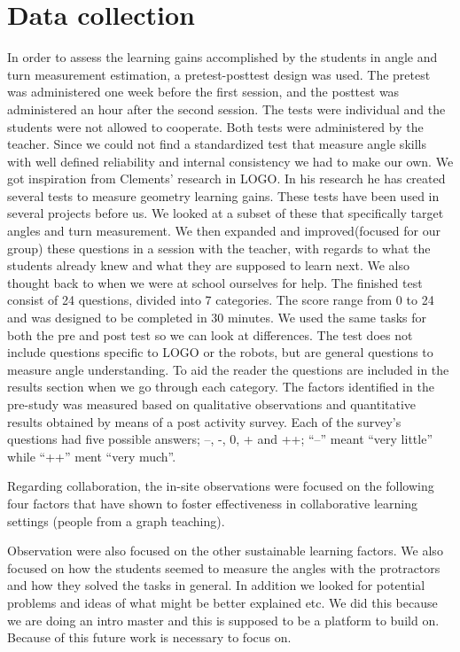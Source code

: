 \chapter{Data collection}
In order to assess the learning gains accomplished by the students in angle and turn measurement estimation, a pretest-posttest design was used. The pretest was administered one week before the first session, and the posttest was administered an hour after the second session. The tests were individual and the students were not allowed to cooperate. Both tests were administered by the teacher. Since we could not find a standardized test that measure angle skills with well defined reliability and internal consistency we had to make our own. We got inspiration from Clements’ research in LOGO. In his research he has created several tests to measure geometry learning gains. These tests have been used in several projects before us. We looked at a subset of these that specifically target angles and turn measurement. We then expanded and improved(focused for our group) these questions in a session with the teacher, with regards to what the students already knew and what they are supposed to learn next. We also thought back to when we were at school ourselves for help. The finished test consist of 24 questions, divided into 7 categories. The score range from 0 to 24 and was designed to be completed in 30 minutes. We used the same tasks for both the pre and post test so we can look at differences. The test does not include questions specific to LOGO or the robots, but are general questions to measure angle understanding. To aid the reader the questions are included in the results section when we go through each category. The factors identified in the pre-study was measured based on qualitative observations and quantitative results obtained by means of a post activity survey. Each of the survey’s questions had five possible answers; --, -, 0, + and ++; “--” meant “very little” while “++” ment “very much”.

\bigskip\noindent
Regarding collaboration, the in-site observations were focused on the following four factors that have shown to foster effectiveness in collaborative learning settings (people from a graph teaching).

\bigskip\noindent
Observation were also focused on the other sustainable learning factors. We also focused on how the students seemed to measure the angles with the protractors and how they solved the tasks in general. In addition we looked for potential problems and ideas of what might be better explained etc. We did this because we are doing an intro master and this is supposed to be a platform to build on. Because of this future work is necessary to focus on. 

